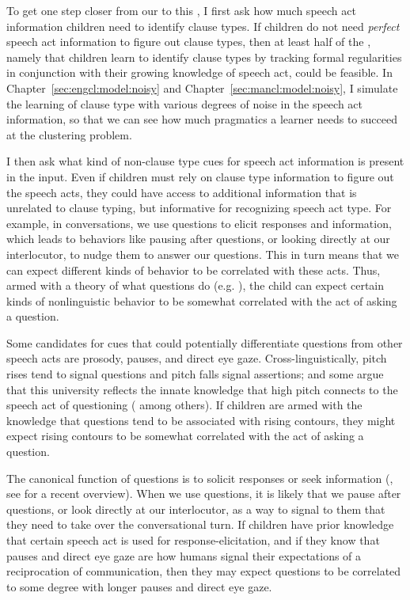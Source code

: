 To get one step closer from our \subhypos{} to this \tbf{\hypos{}}, I first ask how much speech act information children need to identify clause types. If children do not need \emph{perfect} speech act information to figure out clause types, then at least half of the \hypos{}, namely that children learn to identify clause types by tracking formal regularities in conjunction with their growing
knowledge of speech act, could be feasible. 
In Chapter~\ref{sec:engcl:model:noisy} and Chapter~\ref{sec:mancl:model:noisy}, I simulate the learning of clause type with various degrees of noise in the speech act information, so that we can see how much pragmatics a learner needs to succeed at the clustering problem. 

I then %
ask what kind of non-clause type cues for speech act information is present in the input. Even if children must rely on clause type information to figure out the speech acts, they could have access to additional information that is unrelated to clause typing, but informative for recognizing speech act type. For example, in conversations, we use questions to elicit responses and information, which leads to behaviors like pausing after questions, or looking directly at our interlocutor, to nudge them to answer our questions. 
This in turn means that we can expect different kinds of behavior to be correlated with these acts. Thus, armed with a theory of what questions do (e.g. \cite{carruthers2018q}), the child can expect certain kinds of nonlinguistic behavior to be somewhat correlated with the act of asking a question. 

Some candidates for cues that could potentially differentiate questions from other speech acts are prosody, pauses, and direct eye gaze. Cross-linguistically, pitch rises tend to signal questions and pitch falls signal assertions; and some argue that this university reflects the innate knowledge that high pitch connects to the speech act of questioning (\cite{ohala1984,gussenhovenchen2000,gussenhoven2002} among others). If children are armed with the knowledge that questions tend to be associated with rising contours, they might expect rising contours to be somewhat correlated with the act of asking a question. 

The canonical function of questions is to solicit responses or seek information (\citealt{searle1975tax,levinson1983,stivers2010}, see \citealt{krifka2011q} for a recent overview). When we use questions, it is likely that we pause after questions, or look directly at our interlocutor, as a way to signal to them that they need to take over the conversational turn. If children have prior knowledge that certain speech act is used for response-elicitation, and if they know that pauses and direct eye gaze are how humans signal their expectations of a reciprocation of communication, then they may expect questions to be correlated to some degree with longer pauses and direct eye gaze.

